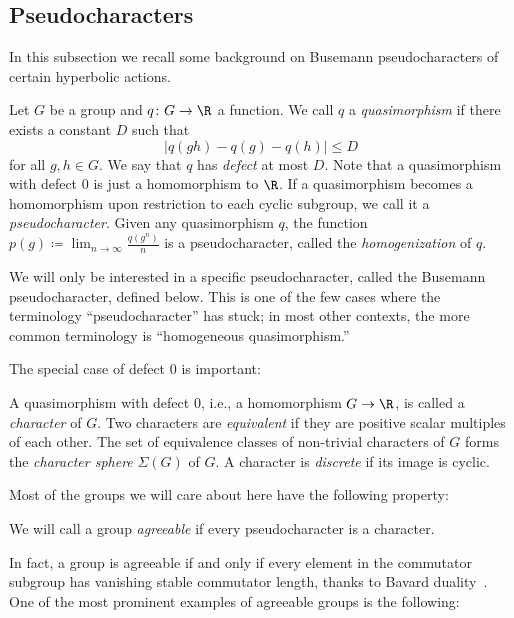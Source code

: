\subsection{Pseudocharacters}\label{ssec:pseudochars}

In this subsection we recall some background on Busemann pseudocharacters of certain hyperbolic actions.

\begin{defi}
Let $G$ be a group and $q\colon G\to\R$ a function. We call $q$ a \emph{quasimorphism} if there exists a constant $D$ such that
\[
|q(gh)-q(g)-q(h)|\le D
\]
for all $g,h\in G$. We say that $q$ has \emph{defect} at most $D$. Note that a quasimorphism with defect $0$ is just a homomorphism to $\R$. If a quasimorphism becomes a homomorphism upon restriction to each cyclic subgroup, we call it a \emph{pseudocharacter}. Given any quasimorphism $q$, the function $p(g)\coloneqq \displaystyle \lim_{n\to\infty}\frac{q(g^n)}{n}$ is a pseudocharacter, called the \emph{homogenization} of $q$.
\end{defi}

\begin{rema}
We will only be interested in a specific pseudocharacter, called the Busemann pseudocharacter, defined below. This is one of the few cases where the terminology ``pseudocharacter'' has stuck; in most other contexts, the more common terminology is ``homogeneous quasimorphism.''
\end{rema}

The special case of defect $0$ is important:

\begin{defi}
A quasimorphism with defect $0$, i.e., a homomorphism $G \to \R$, is called a \emph{character} of $G$. Two characters are \emph{equivalent} if they are positive scalar multiples of each other. The set of equivalence classes of non-trivial characters of $G$ forms the \emph{character sphere} $\Sigma(G)$ of $G$. A character is \emph{discrete} if its image is cyclic.
\end{defi}

Most of the groups we will care about here have the following property:

\begin{defi}
We will call a group \emph{agreeable} if every pseudocharacter is a character.
\end{defi}

In fact, a group is agreeable if and only if every element in the commutator subgroup has vanishing stable commutator length, thanks to Bavard duality~\cite{bavard91}. One of the most prominent examples of agreeable groups is the following:

